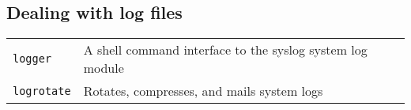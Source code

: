 \documentclass[10pt]{article}
\begin{document}
\begin{multicols}{2}
\hfill

\section{Dealing with log files}
\begin{tabular}{ p{2.5cm} p{8.5cm} }
  \hline
  \texttt{logger} & A shell command interface to the syslog system log module \\
  \rowcolor{Gray}
  \texttt{logrotate} & Rotates, compresses, and mails system logs \\
  \hline
\end{tabular}

\end{multicols}

\newpage

\cheatsheet
\end{document}
